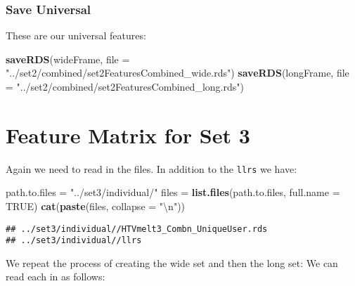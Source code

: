 \documentclass[10pt]{report}
\newenvironment{Shaded}{}{}
\newcommand{\KeywordTok}[1]{\textcolor[rgb]{0.00,0.44,0.13}{\textbf{{#1}}}}
\newcommand{\DataTypeTok}[1]{\textcolor[rgb]{0.56,0.13,0.00}{{#1}}}
\newcommand{\CharTok}[1]{\textcolor[rgb]{0.25,0.44,0.63}{{#1}}}
\newcommand{\StringTok}[1]{\textcolor[rgb]{0.25,0.44,0.63}{{#1}}}
\newcommand{\OtherTok}[1]{\textcolor[rgb]{0.00,0.44,0.13}{{#1}}}
\newcommand{\NormalTok}[1]{{#1}}
\begin{document}
\subsubsection{Save Universal}\label{save-universal-2}

These are our universal features:

\begin{Shaded}
\begin{Highlighting}[]
\KeywordTok{saveRDS}\NormalTok{(wideFrame, }\DataTypeTok{file =} \StringTok{"../set2/combined/set2FeaturesCombined_wide.rds"}\NormalTok{)}
\KeywordTok{saveRDS}\NormalTok{(longFrame, }\DataTypeTok{file =} \StringTok{"../set2/combined/set2FeaturesCombined_long.rds"}\NormalTok{)}
\end{Highlighting}
\end{Shaded}

\section{Feature Matrix for Set 3}\label{feature-matrix-for-set-3}

Again we need to read in the files. In addition to the \verb!llrs! we
have:

\begin{Shaded}
\begin{Highlighting}[]
\NormalTok{path.to.files =}\StringTok{ "../set3/individual/"}
\NormalTok{files =}\StringTok{ }\KeywordTok{list.files}\NormalTok{(path.to.files, }\DataTypeTok{full.name =} \OtherTok{TRUE}\NormalTok{)}
\KeywordTok{cat}\NormalTok{(}\KeywordTok{paste}\NormalTok{(files, }\DataTypeTok{collapse =} \StringTok{"}\CharTok{\textbackslash{}n}\StringTok{"}\NormalTok{))}
\end{Highlighting}
\end{Shaded}

\begin{verbatim}
## ../set3/individual//HTVmelt3_Combn_UniqueUser.rds
## ../set3/individual//llrs
\end{verbatim}

We repeat the process of creating the wide set and then the long set: We
can read each in as follows:
\end{document}
